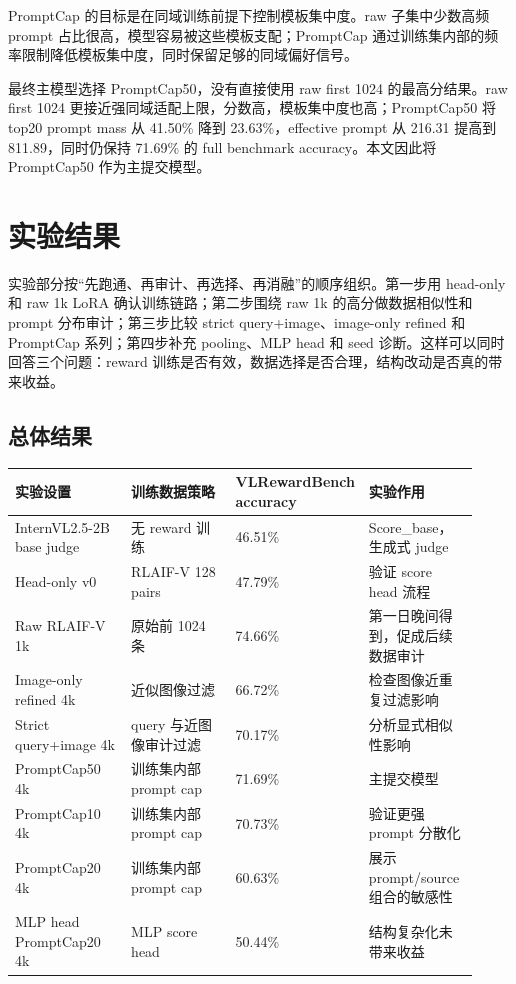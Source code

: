 \documentclass[11pt,a4paper]{ctexart}
\begin{document}
PromptCap 的目标是在同域训练前提下控制模板集中度。raw 子集中少数高频 prompt 占比很高，模型容易被这些模板支配；PromptCap 通过训练集内部的频率限制降低模板集中度，同时保留足够的同域偏好信号。

最终主模型选择 PromptCap50，没有直接使用 raw first 1024 的最高分结果。raw first 1024 更接近强同域适配上限，分数高，模板集中度也高；PromptCap50 将 top20 prompt mass 从 41.50\% 降到 23.63\%，effective prompt 从 216.31 提高到 811.89，同时仍保持 71.69\% 的 full benchmark accuracy。本文因此将 PromptCap50 作为主提交模型。

\section{实验结果}

实验部分按“先跑通、再审计、再选择、再消融”的顺序组织。第一步用 head-only 和 raw 1k LoRA 确认训练链路；第二步围绕 raw 1k 的高分做数据相似性和 prompt 分布审计；第三步比较 strict query+image、image-only refined 和 PromptCap 系列；第四步补充 pooling、MLP head 和 seed 诊断。这样可以同时回答三个问题：reward 训练是否有效，数据选择是否合理，结构改动是否真的带来收益。

\subsection{总体结果}

\begin{center}\small
\begin{longtable}{p{0.26\linewidth} p{0.25\linewidth} p{0.17\linewidth} p{0.24\linewidth}}
\toprule
实验设置 & 训练数据策略 & VLRewardBench accuracy & 实验作用 \\
\midrule
InternVL2.5-2B base judge & 无 reward 训练 & 46.51\% & Score\_base，生成式 judge \\
Head-only v0 & RLAIF-V 128 pairs & 47.79\% & 验证 score head 流程 \\
Raw RLAIF-V 1k & 原始前 1024 条 & 74.66\% & 第一日晚间得到，促成后续数据审计 \\
Image-only refined 4k & 近似图像过滤 & 66.72\% & 检查图像近重复过滤影响 \\
Strict query+image 4k & query 与近图像审计过滤 & 70.17\% & 分析显式相似性影响 \\
PromptCap50 4k & 训练集内部 prompt cap & 71.69\% & 主提交模型 \\
PromptCap10 4k & 训练集内部 prompt cap & 70.73\% & 验证更强 prompt 分散化 \\
PromptCap20 4k & 训练集内部 prompt cap & 60.63\% & 展示 prompt/source 组合的敏感性 \\
MLP head PromptCap20 4k & MLP score head & 50.44\% & 结构复杂化未带来收益 \\
\bottomrule
\end{longtable}\end{center}
\end{document}
